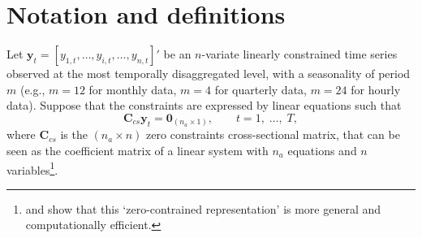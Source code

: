 \documentclass[a4paper,11pt]{article}
\newcommand{\yvet}{\bm{y}}
\newcommand{\Cvet}{\bm{C}}
\newcommand{\Zerovet}{\bm{0}}
\theoremstyle{definition}
\begin{document}
\section{Notation and definitions}\label{sec:not}

Let $\yvet_t = [y_{1,t},\dots,y_{i,t},\dots,y_{n,t}]'$ be an $n$-variate linearly constrained time series observed at the most temporally disaggregated level, with a seasonality of period $m$ (e.g., $m = 12$ for monthly data, $m = 4$ for quarterly data, $m = 24$ for hourly data). Suppose that the constraints are expressed by linear equations such that \citep{difonzo2023}
\begin{equation}
	\label{eq:cs_con}
	\Cvet_{cs}\yvet_t = \Zerovet_{(n_a \times 1)}, \qquad t = 1, \;\dots, \;T,
\end{equation}
where $\Cvet_{cs}$ is the $(n_a \times n)$ zero constraints cross-sectional matrix, that can be seen as the coefficient matrix of a linear system with $n_a$ equations and $n$ variables\footnote{\cite{blogH2022} and \cite{giro2022} show that this ‘zero-contrained representation' is more general and computationally efficient.}.


\end{document}

